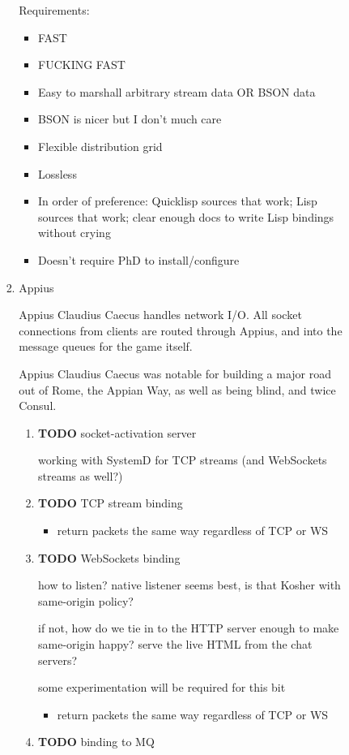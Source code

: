 \documentclass[11pt]{article}
\begin{document}
\begin{enumerate}
\begin{enumerate}
\begin{enumerate}
\begin{enumerate}
Requirements:

\begin{itemize}
\item FAST
\item FUCKING FAST
\item Easy to marshall arbitrary stream data OR BSON data
\item BSON is nicer but I don't much care
\item Flexible distribution grid
\item Lossless
\item In order of preference: Quicklisp sources that work; Lisp sources
that work; clear enough docs to write Lisp bindings without crying
\item Doesn't require PhD to install/configure
\end{itemize}
\item Appius
\label{sec-5-4-1-4-3-2}

Appius Claudius Caecus handles network I/O. All socket connections
from clients are routed through Appius, and into the message queues
for the game itself.

Appius Claudius Caecus was notable for building a major road out of
Rome, the Appian Way, as well as being blind, and twice Consul.

\begin{enumerate}
\item {\bfseries\sffamily TODO} socket-activation server
\label{sec-5-4-1-4-3-2-1}

working with SystemD for TCP streams (and WebSockets streams as well?)
\item {\bfseries\sffamily TODO} TCP stream binding
\label{sec-5-4-1-4-3-2-2}

\begin{itemize}
\item return packets the same way regardless of TCP or WS
\end{itemize}
\item {\bfseries\sffamily TODO} WebSockets binding
\label{sec-5-4-1-4-3-2-3}

how to listen? native listener seems best, is that Kosher with
same-origin policy?

if not, how do we tie in to the HTTP server enough to make
same-origin happy? serve the live HTML from the chat servers?

some experimentation will be required for this bit

\begin{itemize}
\item return packets the same way regardless of TCP or WS
\end{itemize}
\item {\bfseries\sffamily TODO} binding to MQ
\label{sec-5-4-1-4-3-2-4}


\end{enumerate}
\end{enumerate}
\end{enumerate}
\end{enumerate}
\end{enumerate}
\end{document}
